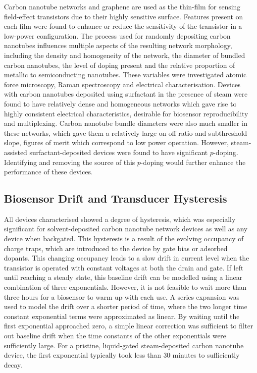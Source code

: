 \documentclass[
  a4paper,
]{scrbook}
\begin{document}
Carbon nanotube networks and graphene are used as the thin-film for
sensing field-effect transistors due to their highly sensitive surface.
Features present on each film were found to enhance or reduce the
sensitivity of the transistor in a low-power configuration. The process
used for randomly depositing carbon nanotubes influences multiple
aspects of the resulting network morphology, including the density and
homogeneity of the network, the diameter of bundled carbon nanotubes,
the level of doping present and the relative proportion of metallic to
semiconducting nanotubes. These variables were investigated atomic force
microscopy, Raman spectroscopy and electrical characterisation. Devices
with carbon nanotubes deposited using surfactant in the presence of
steam were found to have relatively dense and homogeneous networks which
gave rise to highly consistent electrical characteristics, desirable for
biosensor reproducibility and multiplexing. Carbon nanotube bundle
diameters were also much smaller in these networks, which gave them a
relatively large on-off ratio and subthreshold slope, figures of merit
which correspond to low power operation. However, steam-assisted
surfactant-deposited devices were found to have significant
\(p\)-doping. Identifying and removing the source of this \(p\)-doping
would further enhance the performance of these devices.

\hypertarget{biosensor-drift-and-transducer-hysteresis}{%
\subsection{Biosensor Drift and Transducer
Hysteresis}\label{biosensor-drift-and-transducer-hysteresis}}

All devices characterised showed a degree of hysteresis, which was
especially significant for solvent-deposited carbon nanotube network
devices as well as any device when backgated. This hysteresis is a
result of the evolving occupancy of charge traps, which are introduced
to the device by gate bias or adsorbed dopants. This changing occupancy
leads to a slow drift in current level when the transistor is operated
with constant voltages at both the drain and gate. If left until
reaching a steady state, this baseline drift can be modelled using a
linear combination of three exponentials. However, it is not feasible to
wait more than three hours for a biosensor to warm up with each use. A
series expansion was used to model the drift over a shorter period of
time, where the two longer time constant exponential terms were
approximated as linear. By waiting until the first exponential
approached zero, a simple linear correction was sufficient to filter out
baseline drift when the time constants of the other exponentials were
sufficiently large. For a pristine, liquid-gated steam-deposited carbon
nanotube device, the first exponential typically took less than 30
minutes to sufficiently decay.
\end{document}
